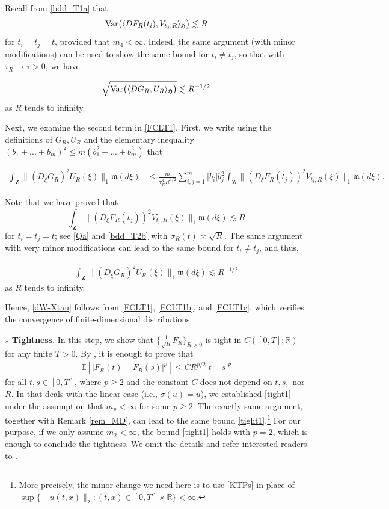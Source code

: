 \documentclass[letterpaper, 11pt,  reqno]{amsart}
\newcommand{\noi}{\noindent}
\newcommand{\R}{\mathbb{R}}
\newcommand{\bE}{\mathbb{E}}
\newcommand{\s}{\sigma}
\newcommand{\les}{\lesssim}
\newcommand{\Var}{\textup{Var}}
\newcommand{\fm}{\mathfrak{m}}
\newcommand{\fH}{\mathfrak{H}}
\numberwithin{equation}{section}
\numberwithin{theorem}{section}
\begin{document}
Recall from \eqref{bdd_T1a} that 
\[
   \Var\big( \langle 
DF_R(t_i), V_{t_j,R} \rangle_{\fH} \big) 
 \les  R
\]
for $t_i = t_j = t$,
provided that $m_4<\infty$.
Indeed,  the same argument (with minor modifications) can be used to show
the same bound for $t_i \neq t_j$, so that 
with $\tau_R\to \tau > 0$, 
we have
 
 \begin{align} \label{FCLT1b}
   \sqrt{{\rm Var}\big(\langle DG_R, U_R \rangle_{\fH}\big)}
\les  R^{-1/2}
\end{align}     as $R$ tends to infinity. 

Next, we examine the second term in \eqref{FCLT1}. 
First, we write using the definitions of $G_R, U_R$
and the elementary inequality $ (b_1 + ... + b_m)^2 \leq m (b_1^2 +... + b_m^2)$
that 

\noi
\begin{align*}
  \int_{\mathbf{Z}} \big\| (D_{\xi} G_R)^2  U_R(\xi) \big\|_1  \fm(d\xi)
  &\leq \frac{m}{\tau_R^3 R^{3/2}} \sum_{i, j=1}^m |b_i| b_j^2   \int_{\mathbf{Z}} \big\|  ( D_{\xi}F_R(t_j) )^2   V_{t_i,R}(\xi)\big\|_1 \fm(d\xi).
\end{align*}

\noi
Note that we have proved  
that
\[
  \int_{\mathbf{Z}} \big\|  ( D_{\xi}F_R(t_j) )^2   V_{t_i,R}(\xi)\big\|_1 \fm(d\xi) \les  R 
  \]
for $t_i = t_j = t$;
see \eqref{Qa} and \eqref{bdd_T2b} with $\s_R(t) \asymp \sqrt{R}$.
The same argument with very minor modifications
can lead to the same bound for $t_i \neq t_j$, and thus, 

\noi
 \begin{align} \label{FCLT1c}
   \int_{\mathbf{Z}} \big\| (D_{\xi} G_R)^2  U_R(\xi) \big\|_1  \fm(d\xi)\les R^{-1/2}
   \end{align}
as $R$ tends to infinity. 

\smallskip

Hence,   \eqref{dW-Xtau} follows from \eqref{FCLT1},  \eqref{FCLT1b}, and  \eqref{FCLT1c},
which verifies  the convergence of  finite-dimensional distributions.  

\smallskip 

$\star$  \textbf{Tightness}. In this step, 
we show that $\{\frac{1}{\sqrt{R}}F_R\}_{R>0}$ is tight in $C([0,T]; \R)$
 for any finite  $T>0$. 
 By \cite[Theorem 12.3]{billingsley68}, it is enough to prove that  
\begin{align}\label{tight1}
\bE[|F_R(t)-F_R(s)|^p] \leq C R^{p/2}|t-s|^p 
\end{align}
for all $t,s \in [0,T]$,
where $p\geq 2$ and
 the constant $C$ does not depend on $t, s,$ nor $R$.
In \cite[Proposition 2.10-(ii)]{BZ23} that deals with the linear case (i.e.,  $\sigma(u)=u$), 
we  established  \eqref{tight1}
under the assumption that  $m_p<\infty$ for some $p \geq 2$.
The exactly same argument, together with Remark \ref{rem_MD},
can lead to the same bound \eqref{tight1}.\footnote{More precisely, 
 the minor change we need here is to use 
 \eqref{KTPs}
 in place of  $\sup\{ \| u(t,x)\|_2 : (t,x)\in[0, T] \times\R \} <\infty$. } 
For our purpose, if we only assume $m_2 <\infty$, the bound 
 \eqref{tight1} holds with $p=2$, which is enough to conclude the tightness. 
We omit the details and refer interested readers to 
 \cite[Proposition 2.10]{BZ23}.
\end{document}
